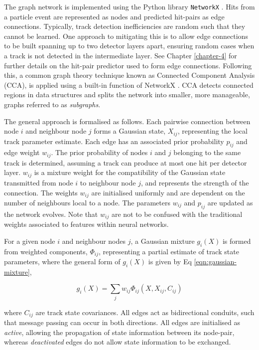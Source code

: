 The graph network is implemented using the Python library \texttt{NetworkX} \cite{SciPyProceedings_11}. Hits from a particle event are represented as nodes and predicted hit-pairs as edge connections. Typically, track detection inefficiencies are random such that they cannot be learned. One approach to mitigating this is to allow edge connections to be built spanning up to two detector layers apart, ensuring random cases when a track is not detected in the intermediate layer. See Chapter \ref{chapter-4} for further details on the hit-pair predictor used to form edge connections. Following this, a common graph theory technique known as Connected Component Analysis (CCA), is applied using a built-in function of NetworkX \cite{networkx}. CCA detects connected regions in data structures and splits the network into smaller, more manageable, graphs referred to as \textit{subgraphs}. 

The general approach is formalised as follows. Each pairwise connection between node $i$ and neighbour node $j$ forms a Gaussian state, $X_{ij}$, representing the local track parameter estimate. Each edge has an associated prior probability $p_{ij}$ and edge weight $w_{ij}$. The prior probability of nodes $i$ and $j$ belonging to the same track is determined, assuming a track can produce at most one hit per detector layer. $w_{ij}$ is a mixture weight for the compatibility of the Gaussian state transmitted from node $i$ to neighbour node $j$, and represents the strength of the connection. The weights $w_{ij}$ are initialised uniformly and are dependent on the number of neighbours local to a node. The parameters $w_{ij}$ and $p_{ij}$ are updated as the network evolves. Note that $w_{ij}$ are not to be confused with the traditional weights associated to features within neural networks. 

For a given node $i$ and neighbour nodes $j$, a Gaussian mixture $g_i(X)$ is formed from weighted components, $\Phi_{ij}$, representing a partial estimate of track state parameters, where the general form of $g_i(X)$ is given by Eq \eqref{eqn:gaussian-mixture},


\begin{equation}
g_i(X) = \sum_{j} w_{ij}\Phi_{ij}(X, X_{ij}, C_{ij})
\label{eqn:gaussian-mixture}
\end{equation}

where $C_{ij}$ are track state covariances. All edges act as bidirectional conduits, such that message passing can occur in both directions. All edges are initialised as \textit{active}, allowing the propagation of state information between its node-pair, whereas \textit{deactivated} edges do not allow state information to be exchanged. 

